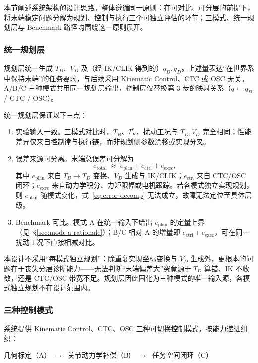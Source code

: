 \documentclass[UTF8, a4paper, 12pt]{ctexart}
\begin{document}
本节阐述系统架构的设计思路。整体遵循同一原则：在可对比、可分层的前提下，将末端稳定问题分解为规划、控制与执行三个可独立评估的环节；三模式、统一规划层与 Benchmark 路径均围绕这一原则展开。

\subsubsection{统一规划层}

规划层统一生成 $T_D$、$V_D$ 及（经 IK/CLIK 得到的）$q_D,\dot{q}_D$。上述量表达``在世界系中保持末端''的任务要求，与后续采用 Kinematic Control、CTC 或 OSC 无关。A/B/C 三种模式共用同一规划层输出，控制层仅替换第 3 步的映射关系（$q\leftarrow q_D$ / CTC / OSC）。

统一规划层保证以下三点：
\begin{enumerate}[label=(\arabic*), leftmargin=2.5em]
    \item 实验输入一致。三模式对比时，$T_B$、$T_E^*$、扰动工况与 $T_D,V_D$ 完全相同；性能差异仅来自控制律与执行链，而非规划侧参数漂移或实现分叉。
    \item 误差来源可分离。末端总误差可分解为
    \begin{equation}
        e_{\mathrm{total}}
        \;\approx\;
        e_{\mathrm{plan}} + e_{\mathrm{ctrl}} + e_{\mathrm{exec}},
        \label{eq:error-decomp}
    \end{equation}
    其中 $e_{\mathrm{plan}}$ 来自 $T_B\rightarrow T_D$ 变换、$V_D$ 生成与 IK/CLIK；$e_{\mathrm{ctrl}}$ 来自 CTC/OSC 闭环；$e_{\mathrm{exec}}$ 来自动力学积分、力矩限幅或电机跟踪。若各模式独立实现规划，则 $e_{\mathrm{plan}}$ 随模式变化，式~\eqref{eq:error-decomp} 无法成立，故障无法定位至具体层级。
    \item Benchmark 可比。模式 A 在统一输入下给出 $e_{\mathrm{plan}}$ 的定量上界（见~\S\ref{sec:mode-a-rationale}）；B/C 相对 A 的增量即 $e_{\mathrm{ctrl}}+e_{\mathrm{exec}}$，可在同一扰动工况下直接相减对比。
\end{enumerate}

本设计不采用``每模式独立规划''：除重复实现坐标变换与 $V_D$ 生成外，更根本的问题在于丧失分层诊断能力——无法判断``末端偏差大''究竟源于 $T_D$ 算错、IK 不收敛，还是 CTC/OSC 带宽不足。规划层因此固化为三种模式的唯一输入源，各模式独立规划不在设计范围内。

\subsubsection{三种控制模式}

系统提供 Kinematic Control、CTC、OSC 三种可切换控制模式，按能力递进组织：
\begin{center}
几何标定（A）$\;\longrightarrow\;$ 关节动力学补偿（B）$\;\longrightarrow\;$ 任务空间闭环（C）
\end{center}
\end{document}
